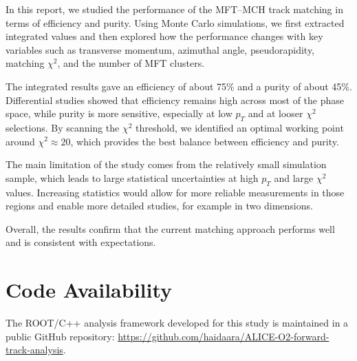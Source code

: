 \documentclass{article}
\begin{document}
In this report, we studied the performance of the MFT--MCH track matching in terms of efficiency and purity. Using Monte Carlo simulations, we first extracted integrated values and then explored how the performance changes with key variables such as transverse momentum, azimuthal angle, pseudorapidity, matching $\chi^2$, and the number of MFT clusters.

The integrated results gave an efficiency of about 75\% and a purity of about 45\%. Differential studies showed that efficiency remains high across most of the phase space, while purity is more sensitive, especially at low $p_T$ and at looser $\chi^2$ selections. By scanning the $\chi^2$ threshold, we identified an optimal working point around $\chi^2 \approx 20$, which provides the best balance between efficiency and purity.

The main limitation of the study comes from the relatively small simulation sample, which leads to large statistical uncertainties at high $p_T$ and large $\chi^2$ values. Increasing statistics would allow for more reliable measurements in those regions and enable more detailed studies, for example in two dimensions.

Overall, the results confirm that the current matching approach performs well and is consistent with expectations.


\section{Code Availability}
The ROOT/C++ analysis framework developed for this study is maintained in a public GitHub repository: \url{https://github.com/haidaara/ALICE-O2-forward-track-analysis}. 


\nocite{*}
\printbibliography
\end{document}
